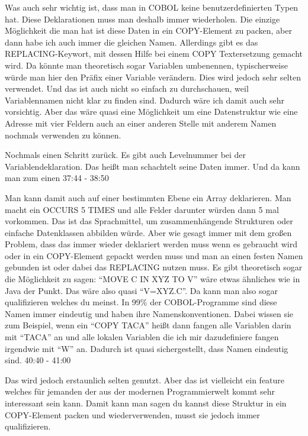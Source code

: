 {Was auch sehr wichtig ist, dass man in COBOL keine benutzerdefinierten Typen hat. Diese Deklarationen muss man deshalb immer wiederholen. Die einzige Möglichkeit die man hat ist diese Daten in ein COPY-Element zu packen, aber dann habe ich auch immer die gleichen Namen. Allerdings gibt es das REPLACING-Keywort, mit dessen Hilfe bei einem COPY Textersetzung gemacht wird. Da könnte man theoretisch sogar Variablen umbenennen, typischerweise würde man hier den Präfix einer Variable verändern. Dies wird jedoch sehr selten verwendet. Und das ist auch nicht so einfach zu durchschauen, weil Variablennamen nicht klar zu finden sind. Dadurch wäre ich damit auch sehr vorsichtig. Aber das wäre quasi eine Möglichkeit um eine Datenstruktur wie eine Adresse mit vier Feldern auch an einer anderen Stelle mit anderem Namen nochmals verwenden zu können.
\medskip

Nochmals einen Schritt zurück. Es gibt auch Levelnummer bei der Variablendeklaration. Das heißt man schachtelt seine Daten immer. Und da kann man zum einen 37:44 - 38:50

Man kann damit auch auf einer bestimmten Ebene ein Array deklarieren. Man macht ein OCCURS 5 TIMES und alle Felder darunter würden dann 5 mal vorkommen. Das ist das Sprachmittel, um zusammenhängende Strukturen oder einfache Datenklassen abbilden würde. Aber wie gesagt immer mit dem großen Problem, dass das immer wieder deklariert werden muss wenn es gebraucht wird oder in ein COPY-Element gepackt werden muss und man an einen festen Namen gebunden ist oder dabei das REPLACING nutzen muss. Es gibt theoretisch sogar die Möglichkeit zu sagen: ``MOVE C IN XYZ TO V'' wäre etwas ähnliches wie in Java der Punkt. Das wäre also quasi ``V=XYZ.C''. Da kann man also sogar qualifizieren welches du meinst. In 99\% der COBOL-Programme sind diese Namen immer eindeutig und haben ihre Namenskonventionen. Dabei wissen sie zum Beispiel, wenn ein ``COPY TACA'' heißt dann fangen alle Variablen darin mit ``TACA'' an und alle lokalen Variablen die ich mir dazudefiniere fangen irgendwie mit ``W'' an. Dadurch ist quasi sichergestellt, dass Namen eindeutig sind.  40:40 - 41:00 

Das wird jedoch erstaunlich selten genutzt. Aber das ist vielleicht ein feature welches für jemanden der aus der modernen Programmierwelt kommt sehr interessant sein kann. Damit kann man sagen du kannst diese Struktur in ein COPY-Element packen und wiederverwenden, musst sie jedoch immer qualifizieren. }


